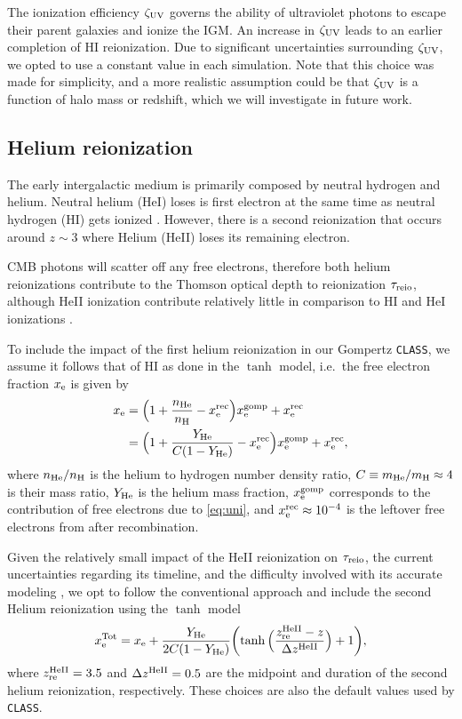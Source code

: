 The ionization efficiency $\zeta_\mathrm{UV}$ governs the ability of ultraviolet
photons to escape their parent galaxies and ionize the IGM. An increase
in $\zeta_\mathrm{UV}$ leads to an earlier completion of HI reionization.
Due to significant uncertainties surrounding $\zeta_\mathrm{UV}$, we opted to use
a constant value in each simulation.
Note that this choice was made for simplicity, and a more realistic
assumption could be that $\zeta_\mathrm{UV}$ is a function of halo mass
\cite{Park2019} or redshift, which we will investigate in future
work.


\subsection*{Helium reionization}
\label{ssec:helium}

The early intergalactic medium is primarily composed by neutral hydrogen
and helium.
Neutral helium (HeI) loses is first electron at the same time as neutral
hydrogen (HI) gets ionized \cite{Trac2007}.
However, there is a second reionization that occurs around $z\sim3$
where Helium (HeII) loses its remaining electron.

CMB photons will scatter off any free electrons, therefore both helium
reionizations contribute to the Thomson optical depth to reionization
$\tau_{\mathrm{reio}}$, although HeII ionization contribute relatively little in
comparison to HI and HeI ionizations \cite{Liu2016}.

To include the impact of the first helium reionization in our Gompertz
\texttt{CLASS}, we assume it follows that of HI as done in the $\tanh$
model, i.e.\ the free electron fraction $x_{\mathrm{e}}$ is given by
%
\begin{align}
\label{eq:xe_H_He}
x_\e
&= \Bigl(1 + \frac{n_\He}{n_\mathrm{H}} - x^\rec_\e\Bigr) x_\e^\gomp
  + x^\rec_\e
\nonumber\\
%
&= \Bigl(1 + \frac{Y_\He}{C (1 - Y_\He)} - x^\rec_\e\Bigr) x_\e^\gomp
  + x^\rec_\e,
\end{align}
%
where $n_{\mathrm{He}} / n_\mathrm{H}$ is the helium to hydrogen number density
ratio, $C \equiv m_{\mathrm{He}} / m_\mathrm{H} \approx 4$ is their mass ratio,
$Y_{\mathrm{He}}$ is the helium mass fraction, $x_{\mathrm{e}}^{\mathrm{gomp}}$ corresponds to the
contribution of free electrons due to \cref{eq:uni}, and $x^{\mathrm{rec}}_{\mathrm{e}}
\approx 10^{-4}$ is the leftover free electrons from after
recombination.

Given the relatively small impact of the HeII reionization on
$\tau_{\mathrm{reio}}$, the current uncertainties regarding its timeline, and the
difficulty involved with its accurate modeling \cite{Hotinli2023,
Upton2020}, we opt to follow the conventional approach and include the
second Helium reionization using the $\tanh$ model
%
\begin{equation}
\label{eq:xe_tot}
x_{\mathrm{e}}^\mathrm{Tot} = x_{\mathrm{e}} + \frac{Y_{\mathrm{He}}}{2C(1 - Y_{\mathrm{He}})}
  \biggl(\tanh{\Bigl(\frac{z_{\mathrm{re}}^{\mathrm{HeII}}- z}{\Delta z^{\mathrm{HeII}}}\Bigr)} + 1\biggr),
\end{equation}
%
where $z_{\mathrm{re}}^{\mathrm{HeII}} = 3.5$ and $\Delta z^{\mathrm{HeII}} = 0.5$ are the midpoint
and duration of the second helium reionization, respectively.
These choices are also the default values used by \texttt{CLASS}.



